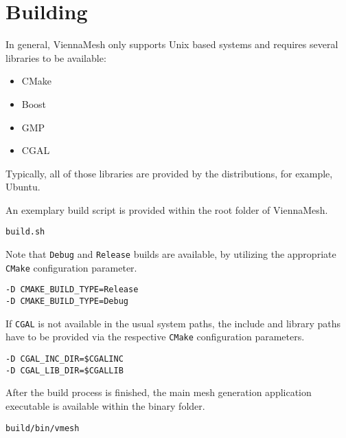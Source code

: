 \section{Building}

In general, ViennaMesh only supports Unix based systems and requires 
several libraries to be available:

\begin{itemize}
   \item CMake~\cite{cmake}
   \item Boost~\cite{boost}
   \item GMP~\cite{gmp}
   \item CGAL~\cite{cgal}
\end{itemize}

Typically, all of those libraries are provided by 
the distributions, for example, Ubuntu. 

An exemplary build script is provided within the root folder of ViennaMesh. 
\begin{exaipd}
\begin{Verbatim}
build.sh
\end{Verbatim}
\end{exaipd}

Note that \texttt{Debug} and \texttt{Release} builds are available, by utilizing 
the appropriate \texttt{CMake} configuration parameter.
\begin{exaipd}
\begin{Verbatim}
-D CMAKE_BUILD_TYPE=Release
-D CMAKE_BUILD_TYPE=Debug
\end{Verbatim}
\end{exaipd}

If \texttt{CGAL} is not available in the usual system paths, the include and 
library paths have to be provided via the 
respective \texttt{CMake} configuration parameters.
\begin{exaipd}
\begin{Verbatim}
-D CGAL_INC_DIR=$CGALINC
-D CGAL_LIB_DIR=$CGALLIB
\end{Verbatim}
\end{exaipd}


After the build process is finished, the main mesh generation application 
executable is available within the binary folder. 
\begin{exaipd}
\begin{Verbatim}
build/bin/vmesh
\end{Verbatim}
\end{exaipd}

